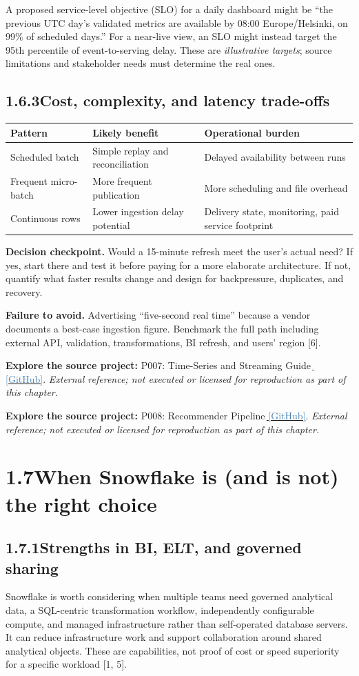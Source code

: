 \documentclass[11pt,twoside]{article}
\newcommand{\topic}[2]{\subsection*{#1\quad #2}}
\newcommand{\repo}[2]{\par\begingroup\small\sffamily\color{inkgray}\textbf{Explore the source project:} #1\,\href{#2}{\,\textcolor{steelblue}{[GitHub]}}. \textit{External reference; not executed or licensed for reproduction as part of this chapter.}\par\endgroup}
\begin{document}
A proposed service-level objective (SLO) for a daily dashboard might be ``the previous UTC day's validated metrics are available by 08:00 Europe/Helsinki, on 99\% of scheduled days.'' For a near-live view, an SLO might instead target the 95th percentile of event-to-serving delay. These are \emph{illustrative targets}; source limitations and stakeholder needs must determine the real ones.

\topic{1.6.3}{Cost, complexity, and latency trade-offs}
\begin{center}\small
\begin{tabularx}{\linewidth}{@{}p{25mm}X X@{}}\toprule
\textbf{Pattern} & \textbf{Likely benefit} & \textbf{Operational burden}\\\midrule
Scheduled batch & Simple replay and reconciliation & Delayed availability between runs\\
Frequent micro-batch & More frequent publication & More scheduling and file overhead\\
Continuous rows & Lower ingestion delay potential & Delivery state, monitoring, paid service footprint\\
\bottomrule\end{tabularx}
\end{center}
\textbf{Decision checkpoint.} Would a 15-minute refresh meet the user's actual need? If yes, start there and test it before paying for a more elaborate architecture. If not, quantify what faster results change and design for backpressure, duplicates, and recovery.

\textbf{Failure to avoid.} Advertising ``five-second real time'' because a vendor documents a best-case ingestion figure. Benchmark the full path including external API, validation, transformations, BI refresh, and users' region [6].
\repo{P007: Time-Series and Streaming Guide}{https://github.com/Snowflake-Labs/sfguide-getting-started-with-time-series-using-snowflake-streaming-sis-ml-notebooks}
\repo{P008: Recommender Pipeline}{https://github.com/Snowflake-Labs/sfguide-recommender-pipeline}

\section*{1.7\quad When Snowflake is (and is not) the right choice}
\topic{1.7.1}{Strengths in BI, ELT, and governed sharing}
Snowflake is worth considering when multiple teams need governed analytical data, a SQL-centric transformation workflow, independently configurable compute, and managed infrastructure rather than self-operated database servers. It can reduce infrastructure work and support collaboration around shared analytical objects. These are capabilities, not proof of cost or speed superiority for a specific workload [1, 5].
\end{document}
